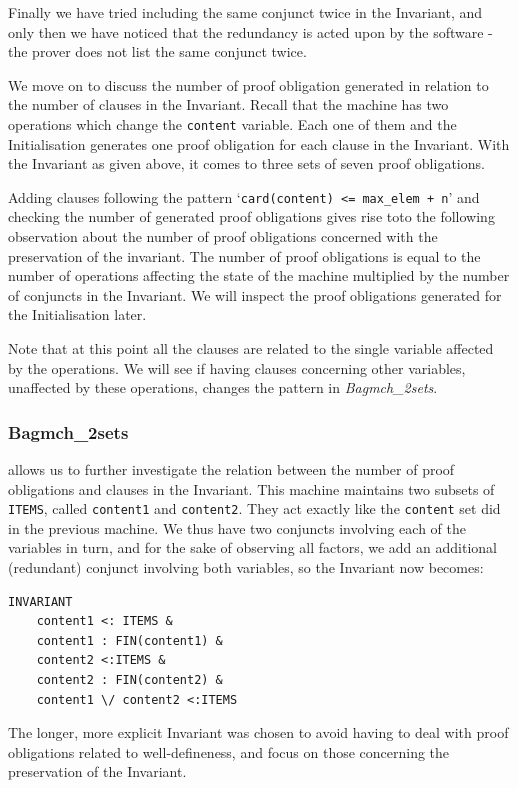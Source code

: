 \documentclass[12pt,journal,duplex]{IEEEtran}
\begin{document}
	Finally we have tried including the same conjunct twice in the Invariant, and only then we have noticed that the redundancy is acted upon by the software - the prover does not list the same conjunct twice.

	We move on to discuss the number of proof obligation generated in relation to the number of clauses in the Invariant. Recall that the machine has two operations which change the \texttt{content} variable. Each one of them and the Initialisation generates one proof obligation for each clause in the Invariant. With the Invariant as given above, it comes to three sets of seven proof obligations.

	Adding clauses following the pattern `\texttt{card(content) <= max\_elem + n}' and checking the number of generated proof obligations gives rise toto the following observation about the number of proof obligations concerned with the preservation of the invariant. The number of proof obligations is equal to the number of operations affecting the state of the machine multiplied by the number of conjuncts in the Invariant. We will inspect the proof obligations generated for the Initialisation later.

	Note that at this point all the clauses are related to the single variable affected by the operations. We will see if having clauses concerning other variables, unaffected by these operations, changes the pattern in \emph{Bagmch\_2sets}.

	\subsubsection{Bagmch\_2sets} allows us to further investigate the relation between the number of proof obligations and clauses in the Invariant. This machine maintains two subsets of \texttt{ITEMS}, called \texttt{content1} and \texttt{content2}. They act exactly like the \texttt{content} set did in the previous machine. We thus have two conjuncts involving each of the variables in turn, and for the sake of observing all factors, we add an additional (redundant) conjunct involving both variables, so the Invariant now becomes:

\begin{lstlisting}
INVARIANT
	content1 <: ITEMS &
	content1 : FIN(content1) &
	content2 <:ITEMS &
	content2 : FIN(content2) &
	content1 \/ content2 <:ITEMS
\end{lstlisting}
	The longer, more explicit Invariant was chosen to avoid having to deal with proof obligations related to well-defineness, and focus on those concerning the preservation of the Invariant.
\end{document}
